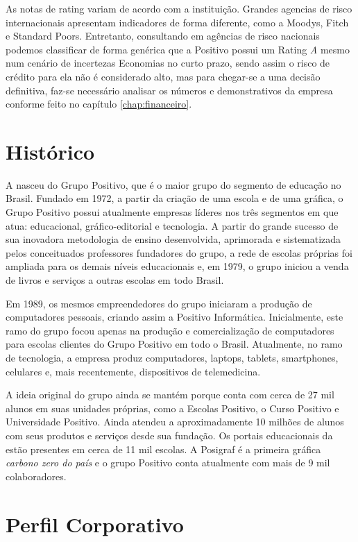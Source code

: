 As notas de rating variam de acordo com a instituição. Grandes agencias de risco internacionais apresentam indicadores de forma diferente, como a Moodys, Fitch e Standard Poors. Entretanto, consultando em agências de risco nacionais podemos classificar de forma genérica que a Positivo possui um Rating \emph{A} mesmo num cenário de incertezas Economias no curto prazo, sendo assim o risco de crédito para ela não é considerado alto, mas para chegar-se a uma decisão definitiva, faz-se necessário analisar os números e demonstrativos da empresa conforme feito no capítulo \ref{chap:financeiro}.

\section{Histórico}
A \nomePositivo{} nasceu do Grupo Positivo, que é o maior grupo do segmento de educação no Brasil\cite{historico2018}. Fundado em 1972, a partir da criação de uma escola e de uma gráfica, o Grupo Positivo possui atualmente empresas líderes nos três segmentos em que atua: educacional, gráfico-editorial e tecnologia. A partir do grande sucesso de sua inovadora metodologia de ensino desenvolvida, aprimorada e sistematizada pelos conceituados professores fundadores do grupo, a rede de escolas próprias foi ampliada para os demais níveis educacionais e, em 1979, o grupo iniciou a venda de livros e serviços a outras escolas em todo Brasil.

Em 1989, os mesmos empreendedores do grupo iniciaram a produção de computadores pessoais, criando assim a Positivo Informática. Inicialmente, este ramo do grupo focou apenas na produção e comercialização de computadores para escolas clientes do Grupo Positivo em todo o Brasil. Atualmente, no ramo de tecnologia, a empresa produz computadores, laptops, tablets, smartphones, celulares e, mais recentemente, dispositivos de telemedicina. 

A ideia original do grupo ainda se mantém porque conta com cerca de 27 mil alunos em suas unidades próprias, como a Escolas Positivo, o Curso Positivo e Universidade Positivo. Ainda atendeu a aproximadamente 10 milhões de alunos com seus produtos e serviços desde sua fundação. Os portais educacionais da \nomePositivo{} estão presentes em cerca de 11 mil escolas. A Posigraf é a primeira gráfica \emph{carbono zero do país} e o grupo Positivo conta atualmente com mais de 9 mil colaboradores.

\section{Perfil Corporativo}

